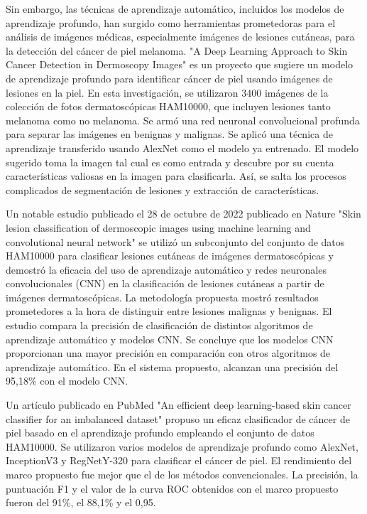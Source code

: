 Sin embargo, las técnicas de aprendizaje automático, incluidos los modelos de aprendizaje profundo, han surgido como herramientas prometedoras para el análisis 
de imágenes médicas, especialmente imágenes de lesiones cutáneas, para la detección del cáncer de piel melanoma. "A Deep Learning Approach to Skin Cancer Detection in Dermoscopy Images"  
es un proyecto que sugiere un modelo de aprendizaje profundo para identificar cáncer de piel usando imágenes de lesiones en la piel. En esta investigación, se utilizaron 3400 imágenes de la colección de fotos dermatoscópicas HAM10000, que incluyen lesiones tanto melanoma como no melanoma. Se armó una red neuronal convolucional profunda para separar las imágenes en benignas y malignas. Se aplicó una técnica de aprendizaje transferido usando AlexNet como el modelo ya entrenado. El modelo sugerido toma la imagen tal cual es como entrada y descubre por su cuenta características valiosas en la imagen para clasificarla. Así, se salta los procesos complicados de segmentación de lesiones y extracción de características.

Un notable estudio publicado el 28 de octubre de 2022 publicado en Nature "Skin lesion classification of dermoscopic images using machine learning and convolutional neural network" 
se utilizó un subconjunto del conjunto de datos HAM10000 para clasificar lesiones cutáneas de imágenes dermatoscópicas y demostró la eficacia del uso de aprendizaje automático y redes neuronales convolucionales (CNN) en la clasificación de lesiones cutáneas a partir de imágenes dermatoscópicas. 
La metodología propuesta mostró resultados prometedores a la hora de distinguir entre lesiones malignas y benignas. El estudio compara la precisión de clasificación de distintos algoritmos de aprendizaje automático y modelos CNN. Se concluye que los modelos CNN proporcionan una mayor precisión en comparación con otros algoritmos de aprendizaje automático. En el sistema propuesto, alcanzan una precisión del 95,18\% con el modelo CNN.


Un artículo publicado en PubMed "An efficient deep learning-based skin cancer classifier for an imbalanced dataset"  
propuso un eficaz clasificador de cáncer de piel basado en el aprendizaje profundo empleando el conjunto de datos HAM10000. Se utilizaron varios modelos de aprendizaje profundo como AlexNet, InceptionV3 y RegNetY-320 para clasificar el cáncer de piel. El rendimiento del marco propuesto fue mejor que el de los métodos convencionales. La precisión, la puntuación F1 y el valor de la curva ROC obtenidos con el marco propuesto fueron del 91\%, el 88,1\% y el 0,95. 


